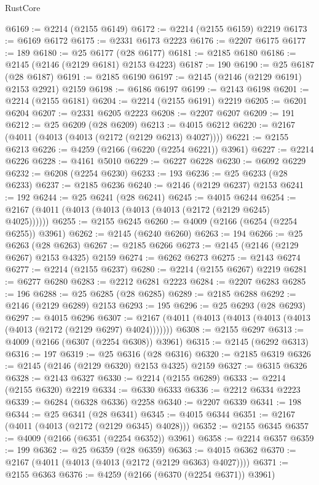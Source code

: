 \begin{lexlean}{RustCore}
\begin{coremodule}
@6169 := @2214 (@2155 @6149)
@6172 := @2214 (@2155 @6159) @2219
@6173 := @6169 @6172
@6175 := @2331 @6173 @2223
@6176 := @2207 @6175
@6177 := 189
@6180 := @25 @6177 (@28 @6177)
@6181 := @2185 @6180
@6186 := @2145 (@2146 (@2129 @6181) @2153 @4223)
@6187 := 190
@6190 := @25 @6187 (@28 @6187)
@6191 := @2185 @6190
@6197 := @2145 (@2146 (@2129 @6191) @2153 @2921) @2159
@6198 := @6186 @6197
@6199 := @2143 @6198
@6201 := @2214 (@2155 @6181)
@6204 := @2214 (@2155 @6191) @2219
@6205 := @6201 @6204
@6207 := @2331 @6205 @2223
@6208 := @2207 @6207
@6209 := 191
@6212 := @25 @6209 (@28 @6209)
@6213 := @4015 @6212
@6220 := @2167 (@4011 (@4013 (@4013 (@2172 (@2129 @6213) @4027))))
@6221 := @2155 @6213
@6226 := @4259 (@2166 (@6220 (@2254 @6221)) @3961)
@6227 := @2214 @6226
@6228 := @4161 @5010
@6229 := @6227 @6228
@6230 := @6092 @6229
@6232 := @6208 (@2254 @6230)
@6233 := 193
@6236 := @25 @6233 (@28 @6233)
@6237 := @2185 @6236
@6240 := @2146 (@2129 @6237) @2153
@6241 := 192
@6244 := @25 @6241 (@28 @6241)
@6245 := @4015 @6244
@6254 := @2167 (@4011 (@4013 (@4013 (@4013 (@4013 (@2172 (@2129 @6245) @4025))))))
@6255 := @2155 @6245
@6260 := @4009 (@2166 (@6254 (@2254 @6255)) @3961)
@6262 := @2145 (@6240 @6260)
@6263 := 194
@6266 := @25 @6263 (@28 @6263)
@6267 := @2185 @6266
@6273 := @2145 (@2146 (@2129 @6267) @2153 @4325) @2159
@6274 := @6262 @6273
@6275 := @2143 @6274
@6277 := @2214 (@2155 @6237)
@6280 := @2214 (@2155 @6267) @2219
@6281 := @6277 @6280
@6283 := @2212 @6281 @2223
@6284 := @2207 @6283
@6285 := 196
@6288 := @25 @6285 (@28 @6285)
@6289 := @2185 @6288
@6292 := @2146 (@2129 @6289) @2153
@6293 := 195
@6296 := @25 @6293 (@28 @6293)
@6297 := @4015 @6296
@6307 := @2167 (@4011 (@4013 (@4013 (@4013 (@4013 (@4013 (@2172 (@2129 @6297) @4024)))))))
@6308 := @2155 @6297
@6313 := @4009 (@2166 (@6307 (@2254 @6308)) @3961)
@6315 := @2145 (@6292 @6313)
@6316 := 197
@6319 := @25 @6316 (@28 @6316)
@6320 := @2185 @6319
@6326 := @2145 (@2146 (@2129 @6320) @2153 @4325) @2159
@6327 := @6315 @6326
@6328 := @2143 @6327
@6330 := @2214 (@2155 @6289)
@6333 := @2214 (@2155 @6320) @2219
@6334 := @6330 @6333
@6336 := @2212 @6334 @2223
@6339 := @6284 (@6328 @6336) @2258
@6340 := @2207 @6339
@6341 := 198
@6344 := @25 @6341 (@28 @6341)
@6345 := @4015 @6344
@6351 := @2167 (@4011 (@4013 (@2172 (@2129 @6345) @4028)))
@6352 := @2155 @6345
@6357 := @4009 (@2166 (@6351 (@2254 @6352)) @3961)
@6358 := @2214 @6357
@6359 := 199
@6362 := @25 @6359 (@28 @6359)
@6363 := @4015 @6362
@6370 := @2167 (@4011 (@4013 (@4013 (@2172 (@2129 @6363) @4027))))
@6371 := @2155 @6363
@6376 := @4259 (@2166 (@6370 (@2254 @6371)) @3961)

\end{coremodule}
\end{lexlean}
